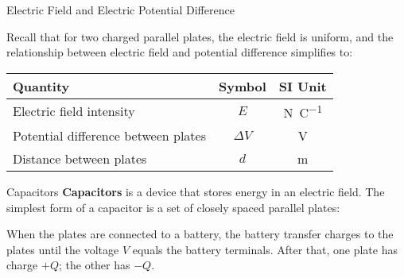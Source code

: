 \documentclass[12pt,aspectratio=169]{beamer}
\begin{document}
\begin{frame}{Electric Field and Electric Potential Difference}
  \begin{center}
  \end{center}
  \vspace{-.1in}Recall that for two charged parallel plates, the electric field
  is uniform, and the relationship between electric field and potential
  difference simplifies to:

  \begin{center}
    \begin{tabular}{l|c|c}
      \rowcolor{pink}
      \textbf{Quantity} & \textbf{Symbol} & \textbf{SI Unit} \\ \hline
      Electric field intensity & $E$ & \si{\newton\per\coulomb}\\
      Potential difference between plates & $\Delta V$ & \si\volt \\
      Distance between plates       & $d$ & \si\metre
    \end{tabular}
  \end{center}
\end{frame}



\begin{frame}{Capacitors}
  \textbf{Capacitors} is a device that stores energy in an electric field. The
  simplest form of a capacitor is a set of closely spaced parallel plates:
  \begin{center}
  \end{center}
  When the plates are connected to a battery, the battery transfer charges to
  the plates until the voltage $V$ equals the battery terminals. After that,
  one plate has charge $+Q$; the other has $-Q$.
\end{frame}
\end{document}
